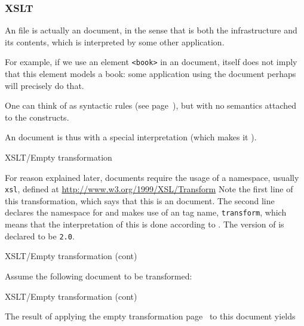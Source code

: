 %
\begin{frame}[containsverbatim]
\frametitle{XSLT}

An \XSLT file is actually an \XML document, in the sense that \XML is
both the infrastructure and its contents, which is interpreted by some
other application.

\bigskip

For example, if we use an element \verb|<book>| in an \XML document,
\XML itself does not imply that this element models a book: some
application using the document perhaps will precisely do that.

\bigskip

One can think of \XML as syntactic rules (see
page~\pageref{well_formedness}), but with no semantics attached to the
constructs.

\bigskip

An \XSLT document is thus \XML with a special interpretation (which
makes it \XSLT).

\end{frame}

%
\begin{frame}{XSLT/Empty transformation}
\label{empty.xsl}

For reason explained later, \XSLT documents require the usage of a
namespace, usually \texttt{xsl}, defined at
{\small \url{http://www.w3.org/1999/XSL/Transform}}
Note the first line of this transformation, which says that this is an
\XML document. The second line declares the namespace for \XSLT and
makes use of an \XSLT tag name, \texttt{transform}, which means that
the interpretation of this \XML is done according to \XSLT. The
version of \XSLT is declared to be \texttt{2.0}.

\end{frame}

%
\begin{frame}{XSLT/Empty transformation (cont)}
\label{cookbook.xml}

Assume the following \XML document to be transformed:

\end{frame}

%
\begin{frame}{XSLT/Empty transformation (cont)}

The result of applying the empty transformation
page~\pageref{empty.xsl} to this document yields

\end{frame}

